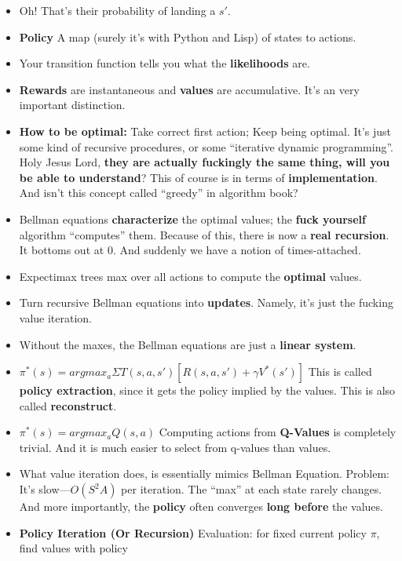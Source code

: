 \documentclass[twocolumn]{article}
\begin{document}
\begin{itemize}
\item Oh! That's their probability of landing a $s'$.
\item \textbf{Policy} A map (surely it's with Python and Lisp) of
  states to actions.
\item Your transition function tells you what the \textbf{likelihoods}
  are. 
\item {\color{red} \textbf{Rewards} are instantaneous and \textbf{values} are
    accumulative.} It's an very important distinction. 
\item \textbf{How to be optimal:} Take correct first action; Keep
  being optimal. It's just some kind of recursive procedures, or some
  ``iterative dynamic programming''. Holy Jesus Lord, \textbf{they are
  actually fuckingly the same thing, will you be able to understand}?
  This of course is in terms of \textbf{implementation}. And isn't
  this concept called ``greedy'' in algorithm book?
\item Bellman equations \textbf{characterize} the optimal values; the
  \textbf{fuck yourself} algorithm ``computes'' them. Because of this,
  there is now a \textbf{real recursion}. It bottoms out at $0$. And
  suddenly we have a notion of times-attached.
\item Expectimax trees max over all actions to compute the
  \textbf{optimal} values.
\item Turn recursive Bellman equations into \textbf{updates}. Namely,
  it's just the fucking value iteration.
\item Without the maxes, the Bellman equations are just a
  \textbf{linear system}.
\item $\pi^{*}(s)={\displaystyle argmax_{a}}\Sigma
  T(s,a,s')[R(s,a,s')+\gamma V^{*}(s')]$ This is called \textbf{policy
  extraction}, since it gets the policy implied by the values. This is
  also called \textbf{reconstruct}.
\item $\pi^{*}(s)=argmax_{a}Q(s,a)$ Computing actions from
  \textbf{Q-Values} is completely trivial. And it is much easier to
  select from q-values than values.
\item What value iteration does, is essentially mimics Bellman
  Equation. Problem: It's slow---$O(S^{2}A)$ per iteration. The
  ``max'' at each state rarely changes. And more importantly, the
  \textbf{policy} often converges \textbf{long before} the values.
\item \textbf{Policy Iteration (Or Recursion)} Evaluation: for fixed
  current policy $\pi$, find values with policy

\end{itemize}
\end{document}
